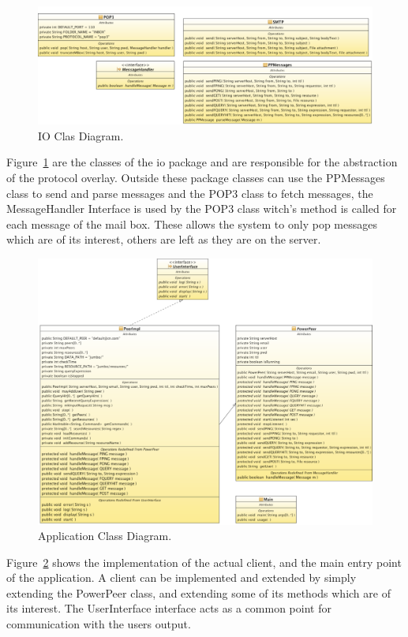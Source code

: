 \documentclass{article}
\begin{document}
\begin{figure}[!hbtp]
\centering
\includegraphics[width=\textwidth]{../img/IoClassDiagram.pdf}
\caption{IO Clas Diagram.}
\label{fig:ioclassdia}
\end{figure}
Figure~\ref{fig:ioclassdia} are the classes of the io package and are responsible
for the abstraction of the protocol overlay. Outside these package classes can
use the PPMessages class to send and parse messages and the POP3 class to fetch
messages, the MessageHandler Interface is used by the POP3 class witch's method
is called for each message of the mail box. These allows the system to only pop
messages which are of its interest, others are left as they are on the server.

\begin{figure}[!hbtp]
\centering
\includegraphics[width=\textwidth]{../img/AppClassDiagram.pdf}
\caption{Application Class Diagram.}
\label{fig:appclassdia}
\end{figure}
Figure~\ref{fig:appclassdia} shows the implementation of the actual client, and
the main entry point of the application. A client can be implemented and
extended by simply extending the PowerPeer class, and extending some of its
methods which are of its interest. The UserInterface interface acts as a common
point for communication with the users output.
\end{document}
